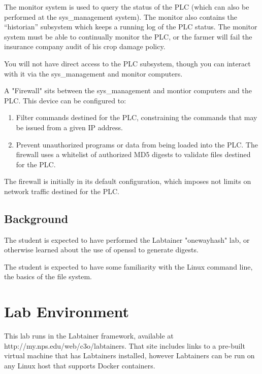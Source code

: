 The monitor system is used to query the status of the PLC (which can also be performed at the 
sys\_management system).  The monitor also contains the ``historian'' subsystem which keeps a running
log of the PLC status.  The monitor system must be able to continually monitor the PLC, or 
the farmer will fail the insurance company audit of his crop damage policy.

You will not have direct access to the PLC subsystem, 
though you can interact with it via the sys\_management and monitor computers.

A "Firewall" sits between the sys\_management and montior computers and the PLC.   
This device can be configured to:

\begin{enumerate}
\item Filter commands destined for the PLC, constraining the commands that may be issued from a given IP address.
\item Prevent unauthorized programs or data from being loaded into the PLC.   The firewall uses a whitelist of 
authorized MD5 digests to validate files destined for the PLC.
\end{enumerate}
The firewall is initially in its default configuration, which imposes not limits on network traffic destined
for the PLC.

\subsection {Background}
The student is expected 
to have performed the Labtainer "onewayhash" lab, or otherwise learned about 
the use of openssl to generate digests.

The student is expected to have some familiarity with the Linux command line,
the basics of the file system.

\section{Lab Environment}
This lab runs in the Labtainer framework,
available at http://my.nps.edu/web/c3o/labtainers.
That site includes links to a pre-built virtual machine
that has Labtainers installed, however Labtainers can
be run on any Linux host that supports Docker containers.

